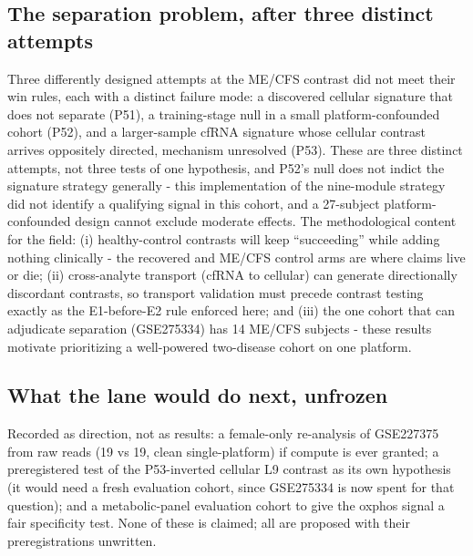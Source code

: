 \documentclass[11pt,a4paper]{article}
\begin{document}
\subsection{The separation problem, after three distinct attempts}
Three differently designed attempts at the ME/CFS contrast did not meet
their win rules, each with a distinct failure mode: a discovered cellular
signature that does not separate (P51), a training-stage null in a small
platform-confounded cohort (P52), and a larger-sample cfRNA signature whose
cellular contrast arrives oppositely directed, mechanism unresolved (P53).
These are three distinct attempts, not three tests of one hypothesis, and
P52's null does not indict the signature strategy generally - this
implementation of the nine-module strategy did not identify a qualifying
signal in this cohort, and a 27-subject platform-confounded design cannot
exclude moderate effects. The methodological content for the field: (i)
healthy-control contrasts will keep ``succeeding'' while adding nothing
clinically - the recovered and ME/CFS control arms are where claims live or
die; (ii) cross-analyte transport (cfRNA to cellular) can generate
directionally discordant contrasts, so transport validation must precede
contrast testing exactly as the E1-before-E2 rule enforced here; and (iii)
the one cohort that can adjudicate separation (GSE275334) has 14 ME/CFS
subjects - these results motivate prioritizing a well-powered two-disease
cohort on one platform.

\subsection{What the lane would do next, unfrozen}
Recorded as direction, not as results: a female-only re-analysis of GSE227375
from raw reads (19 vs 19, clean single-platform) if compute is ever granted;
a preregistered test of the P53-inverted cellular L9 contrast as its own
hypothesis (it would need a fresh evaluation cohort, since GSE275334 is now
spent for that question); and a metabolic-panel evaluation cohort to give
the oxphos signal a fair specificity test. None of these is claimed; all are
proposed with their preregistrations unwritten.
\end{document}
